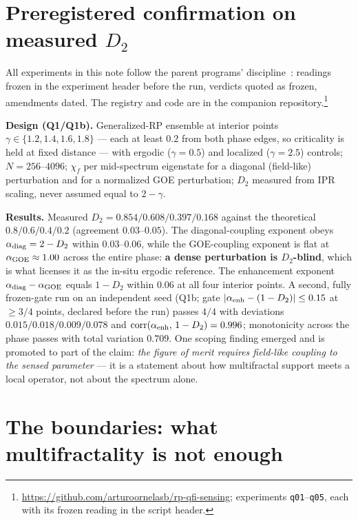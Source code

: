 \documentclass[11pt]{article}
\newcommand{\chif}{\chi_{f}}
\begin{document}
\section{Preregistered confirmation on measured $D_2$}
\label{sec:q1}

All experiments in this note follow the parent programs'
discipline~\cite{ornelas2026fem}: readings frozen in the experiment header before the run, verdicts
quoted as frozen, amendments dated. The registry and code are in the companion
repository.\footnote{\url{https://github.com/arturoornelasb/rp-qfi-sensing}; experiments
\texttt{q01}--\texttt{q05}, each with its frozen reading in the script header.}

\textbf{Design (Q1/Q1b).} Generalized-RP ensemble at interior points
$\gamma \in \{1.2, 1.4, 1.6, 1.8\}$ --- each at least $0.2$ from both phase edges, so criticality
is held at fixed distance --- with ergodic ($\gamma=0.5$) and localized ($\gamma=2.5$) controls;
$N = 256$--$4096$; $\chif$ per mid-spectrum eigenstate for a diagonal (field-like) perturbation and
for a normalized GOE perturbation; $D_2$ measured from IPR scaling, never assumed equal to
$2-\gamma$.

\textbf{Results.} Measured $D_2 = 0.854/0.608/0.397/0.168$ against the theoretical
$0.8/0.6/0.4/0.2$ (agreement $0.03$--$0.05$). The diagonal-coupling exponent obeys
$\alpha_{\rm diag} = 2-D_2$ within $0.03$--$0.06$, while the GOE-coupling exponent is flat at
$\alpha_{\rm GOE} \approx 1.00$ across the entire phase: \textbf{a dense perturbation is
$D_2$-blind}, which is what licenses it as the in-situ ergodic reference. The enhancement exponent
$\alpha_{\rm diag}-\alpha_{\rm GOE}$ equals $1-D_2$ within $0.06$ at all four interior points. A
second, fully frozen-gate run on an independent seed (Q1b; gate $|\alpha_{\rm enh}-(1-D_2)| \le
0.15$ at $\ge 3/4$ points, declared before the run) passes $4/4$ with deviations
$0.015/0.018/0.009/0.078$ and $\mathrm{corr}(\alpha_{\rm enh},\,1-D_2) = 0.996$; monotonicity
across the phase passes with total variation $0.709$. One scoping finding emerged and is promoted
to part of the claim: \emph{the figure of merit requires field-like coupling to the sensed
parameter} --- it is a statement about how multifractal support meets a local operator, not about
the spectrum alone.

\section{The boundaries: what multifractality is not enough}
\label{sec:scope}
\end{document}
